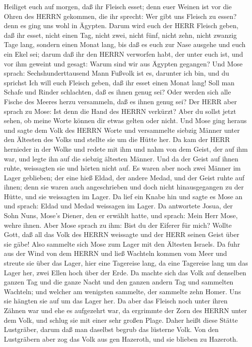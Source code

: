 Heiliget euch auf morgen, daß ihr Fleisch esset; denn euer Weinen ist
vor die Ohren des HERRN gekommen, die ihr sprecht: Wer gibt uns Fleisch
zu essen? denn es ging uns wohl in Ägypten. Darum wird euch der HERR
Fleisch geben, daß ihr esset,  nicht einen Tag, nicht zwei,
nicht fünf, nicht zehn, nicht zwanzig Tage lang,  sondern
einen Monat lang, bis daß es euch zur Nase ausgehe und euch ein Ekel
sei; darum daß ihr den HERRN verworfen habt, der unter euch ist, und vor
ihm geweint und gesagt: Warum sind wir aus Ägypten gegangen?
 Und Mose sprach: Sechshunderttausend Mann Fußvolk ist es,
darunter ich bin, und du sprichst Ich will euch Fleisch geben, daß ihr
esset einen Monat lang!  Soll man Schafe und Rinder
schlachten, daß es ihnen genug sei? Oder werden sich alle Fische des
Meeres herzu versammeln, daß es ihnen genug sei?  Der HERR
aber sprach zu Mose: Ist denn die Hand des HERRN verkürzt? Aber du
sollst jetzt sehen, ob meine Worte können dir etwas gelten oder nicht.
 Und Mose ging heraus und sagte dem Volk des HERRN Worte
und versammelte siebzig Männer unter den Ältesten des Volks und stellte
sie um die Hütte her.  Da kam der HERR hernieder in der
Wolke und redete mit ihm und nahm von dem Geist, der auf ihm war, und
legte ihn auf die siebzig ältesten Männer. Und da der Geist auf ihnen
ruhte, weissagten sie und hörten nicht auf.  Es waren aber
noch zwei Männer im Lager geblieben; der eine hieß Eldad, der andere
Medad, und der Geist ruhte auf ihnen; denn sie waren auch angeschrieben
und doch nicht hinausgegangen zu der Hütte, und sie weissagten im Lager.
 Da lief ein Knabe hin und sagte es Mose an und sprach:
Eldad und Medad weissagen im Lager.  Da antwortete Josua,
der Sohn Nuns, Mose's Diener, den er erwählt hatte, und sprach: Mein
Herr Mose, wehre ihnen.  Aber Mose sprach zu ihm: Bist du
der Eiferer für mich? Wollte Gott, daß all das Volk des HERRN weissagte
und der HERR seinen Geist über sie gäbe!  Also sammelte
sich Mose zum Lager mit den Ältesten Israels.  Da fuhr aus
der Wind von dem HERRN und ließ Wachteln kommen vom Meer und streute sie
über das Lager, hier eine Tagereise lang, da eine Tagereise lang um das
Lager her, zwei Ellen hoch über der Erde.  Da machte sich
das Volk auf denselben ganzen Tag und die ganze Nacht und den ganzen
andern Tag und sammelten Wachteln; und welcher am wenigsten sammelte,
der sammelte zehn Homer. Uns sie hängten sie auf um das Lager her.
 Da aber das Fleisch noch unter ihren Zähnen war und ehe es
aufgezehrt war, da ergrimmte der Zorn des HERRN unter dem Volk, und
schlug sie mit einer sehr großen Plage.  Daher heißt diese
Stätte Lustgräber, darum daß man daselbst begrub das lüsterne Volk.
 Von den Lustgräbern aber zog das Volk aus gen Hazeroth,
und sie blieben zu Hazeroth.

